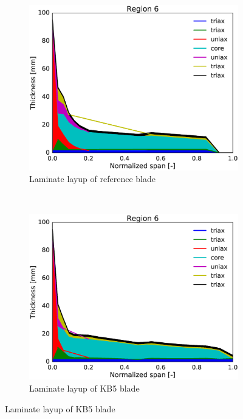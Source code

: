 \begin{figure}[tph]
\begin{subfigure}{0.50\textwidth}
\includegraphics[width=\linewidth]{figures/KB6_final/baseline_laminate_layers_r06.eps}
\caption{Laminate layup of reference blade}
\label{subfig:baseline_layers_r06}
\end{subfigure}
 ~
\begin{subfigure}{0.50\textwidth}
\includegraphics[width=\linewidth]{figures/KB6_final/KB5_laminate_layers_r06.eps}
\caption{Laminate layup of KB5 blade}
\label{subfig:KB5_layers_r06}
\end{subfigure}


\end{figure}
